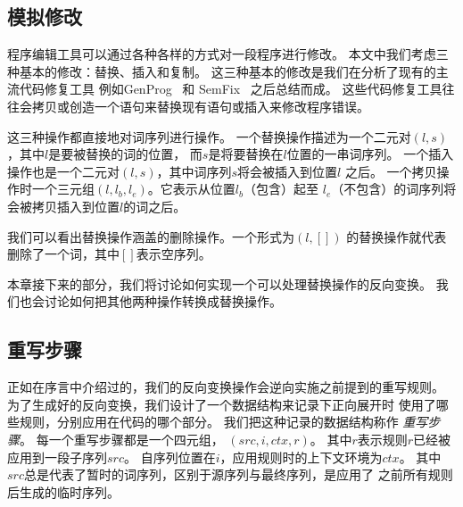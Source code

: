 
\subsection{模拟修改}\label{sec:changes}
程序编辑工具可以通过各种各样的方式对一段程序进行修改。
本文中我们考虑三种基本的修改：替换、插入和复制。
这三种基本的修改是我们在分析了现有的主流代码修复工具
例如GenProg~\parencite{le2012genprog} 和 SemFix~\parencite{nguyen2013semfix}
之后总结而成。
这些代码修复工具往往会拷贝或创造一个语句来替换现有语句或插入来修改程序错误。

这三种操作都直接地对词序列进行操作。
一个替换操作描述为一个二元对$(l, s)$，其中$l$是要被替换的词的位置，
而$s$是将要替换在$l$位置的一串词序列。
一个插入操作也是一个二元对$(l, s)$，其中词序列$s$将会被插入到位置$l$
之后。
一个拷贝操作时一个三元组$(l, l_b, l_e)$。它表示从位置$l_b$（包含）起至
$l_e$（不包含）的词序列将会被拷贝插入到位置$l$的词之后。

我们可以看出替换操作涵盖的删除操作。一个形式为$(l, [])$
的替换操作就代表删除了一个词，其中$[]$表示空序列。

本章接下来的部分，我们将讨论如何实现一个可以处理替换操作的反向变换。
我们也会讨论如何把其他两种操作转换成替换操作。

\subsection{重写步骤}\label{sec:steps}
正如在序言中介绍过的，我们的反向变换操作会逆向实施之前提到的重写规则。
为了生成好的反向变换，我们设计了一个数据结构来记录下正向展开时
使用了哪些规则，分别应用在代码的哪个部分。
我们把这种记录的数据结构称作 \emph{重写步骤}。
每一个重写步骤都是一个四元组， $(src, i, ctx, r)$。
其中$r$表示规则$r$已经被应用到一段子序列$src$。
自序列位置在$i$，应用规则时的上下文环境为$ctx$。
其中$src$总是代表了暂时的词序列，区别于源序列与最终序列，是应用了
之前所有规则后生成的临时序列。

